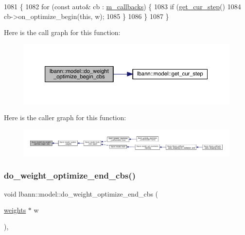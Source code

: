 \begin{DoxyCode}
1081                                                    \{
1082   \textcolor{keywordflow}{for} (\textcolor{keyword}{const} \textcolor{keyword}{auto}& cb : \hyperlink{classlbann_1_1model_a07b511fef30368494c2ad80922ffd0eb}{m\_callbacks}) \{
1083     \textcolor{keywordflow}{if} (\hyperlink{classlbann_1_1model_ad0cdcba177434b52dc9c4a97be183a92}{get\_cur\_step}() %
1084       cb->on\_optimize\_begin(\textcolor{keyword}{this}, w);
1085     \}
1086   \}
1087 \}
\end{DoxyCode}
Here is the call graph for this function\+:\nopagebreak
\begin{figure}[H]
\begin{center}
\leavevmode
\includegraphics[width=350pt]{classlbann_1_1model_a24b668fa62ce0215d3b1773636b7eced_cgraph}
\end{center}
\end{figure}
Here is the caller graph for this function\+:\nopagebreak
\begin{figure}[H]
\begin{center}
\leavevmode
\includegraphics[width=350pt]{classlbann_1_1model_a24b668fa62ce0215d3b1773636b7eced_icgraph}
\end{center}
\end{figure}
\mbox{\label{classlbann_1_1model_af1e22d2b06d0ca90ae79fd5cf1d82066}} 
\subsubsection{\texorpdfstring{do\+\_\+weight\+\_\+optimize\+\_\+end\+\_\+cbs()}{do\_weight\_optimize\_end\_cbs()}}
{\footnotesize\ttfamily void lbann\+::model\+::do\+\_\+weight\+\_\+optimize\+\_\+end\+\_\+cbs (\begin{DoxyParamCaption}\item[{\hyperlink{classlbann_1_1weights}{weights} $\ast$}]{w }\end{DoxyParamCaption})\hspace{0.3cm}{\ttfamily [protected]}, {\ttfamily [virtual]}}

